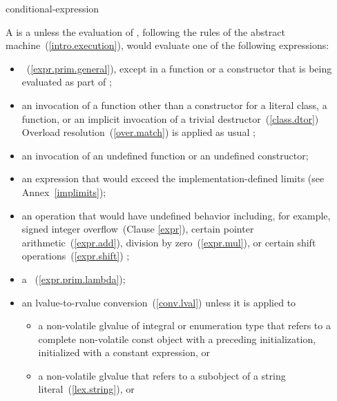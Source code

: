 \begin{bnf}
\br
    conditional-expression
\end{bnf}

\pnum
A   is a 
unless the evaluation of , following the rules of the abstract
machine~(\ref{intro.execution}), would evaluate one of the following expressions:

\begin{itemize}
\item
{}~(\ref{expr.prim.general}), except in a 
function or a  constructor that is being evaluated as part
of ;

\item
an invocation of a function other than
a  constructor for a literal class,
a  function,
or an implicit invocation of a trivial destructor~(\ref{class.dtor})
\enternote Overload resolution~(\ref{over.match})
is applied as usual \exitnote;

\item
an invocation of an undefined  function or an
undefined  constructor;

\item
an expression that would exceed the implementation-defined
limits (see Annex~\ref{implimits});

\item
an operation that would have undefined behavior \enternote including,
for example, signed integer overflow~(Clause \ref{expr}), certain
pointer arithmetic~(\ref{expr.add}), division by
zero~(\ref{expr.mul}), or certain shift operations~(\ref{expr.shift})
\exitnote;

\item
a ~(\ref{expr.prim.lambda});

\item
an lvalue-to-rvalue conversion~(\ref{conv.lval}) unless
it is applied to

\begin{itemize}
  \item
  a non-volatile glvalue of integral or enumeration type that refers
  to a complete non-volatile const object with a preceding initialization,
  initialized with a constant expression, or

  \item
  a non-volatile glvalue that refers to a subobject of a string
  literal~(\ref{lex.string}), or


\end{itemize}
\end{itemize}
